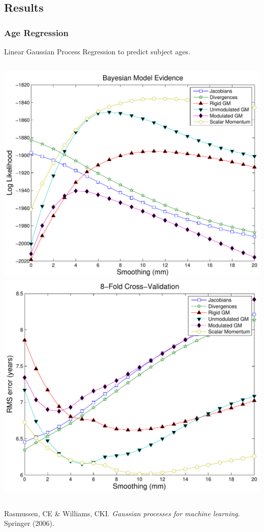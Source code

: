 \documentclass{beamer}
\begin{document}
\subsection{Results}
\begin{frame}
\frametitle{Age Regression}
Linear Gaussian Process Regression to predict subject ages.
\begin{columns}[c]
\includegraphics[width=1\textwidth]{age_loglikelihood}
\includegraphics[width=1\textwidth]{age_rms}
\end{columns}

\begin{tiny}
Rasmussen, CE \& Williams, CKI. \emph{Gaussian processes for machine learning}. Springer (2006).

\end{tiny}
\end{frame}
\end{document}
